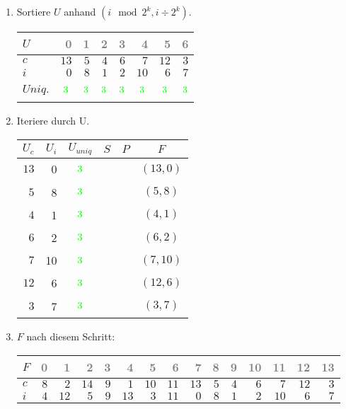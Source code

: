 \begin{enumerate}
\item 
Sortiere $U$ anhand $(i \mod 2^k, i \div 2^k)$.
\begin{center}
\small\begin{tabular}{lrrrrrrr}
    \toprule 
    $U$ & \textcolor{gray}{0} & \textcolor{gray}{1} & \textcolor{gray}{2} & \textcolor{gray}{3} & \textcolor{gray}{4} & \textcolor{gray}{5} & \textcolor{gray}{6}\\
    \midrule 
    $c$ & $13$ & $5$ & $4$ & $6$ & $7$ & $12$ & $3$ \\
    $i$ & $0$ & $8$ & $1$ & $2$ & $10$ & $6$ & $7$ \\
    $Uniq.$ & $$\cmarkc$$ & $$\cmarkc$$ & $$\cmarkc$$ & $$\cmarkc$$ & $$\cmarkc$$ & $$\cmarkc$$ & $$\cmarkc$$ \\
    \bottomrule 
\end{tabular}
\end{center}

\item 
Iteriere durch U.

\begin{center}
\small\begin{tabular}{rrcccc}
\toprule 
 $U_c$ & $U_i$ & $U_{uniq}$ &     $S$      &   $P$   &   $F$   \\
\midrule 
$13$ & 0 & $$\cmarkc$$  &            &       & $(13, 0)$\\
$ 5$ & 8 & $$\cmarkc$$  &            &       & $( 5, 8)$\\
$ 4$ & 1 & $$\cmarkc$$  &            &       & $( 4, 1)$\\
$ 6$ & 2 & $$\cmarkc$$  &            &       & $( 6, 2)$\\
$ 7$ & 10 & $$\cmarkc$$  &            &       & $( 7,10)$\\
$12$ & 6 & $$\cmarkc$$  &            &       & $(12, 6)$\\
$ 3$ & 7 & $$\cmarkc$$  &            &       & $( 3, 7)$\\
\bottomrule 
\end{tabular}
\end{center}
\item 
$F$ nach diesem Schritt:
\begin{center}
\small\begin{tabular}{lrrrrrrrrrrrrrr}
    \toprule 
    $F$ & \textcolor{gray}{0} & \textcolor{gray}{1} & \textcolor{gray}{2} & \textcolor{gray}{3} & \textcolor{gray}{4} & \textcolor{gray}{5} & \textcolor{gray}{6} & \textcolor{gray}{7} & \textcolor{gray}{8} & \textcolor{gray}{9} & \textcolor{gray}{10} & \textcolor{gray}{11} & \textcolor{gray}{12} & \textcolor{gray}{13}\\
    \midrule 
    $c$ & $8$ & $2$ & $14$ & $9$ & $1$ & $10$ & $11$ & $13$ & $5$ & $4$ & $6$ & $7$ & $12$ & $3$ \\
    $i$ & $4$ & $12$ & $5$ & $9$ & $13$ & $3$ & $11$ & $0$ & $8$ & $1$ & $2$ & $10$ & $6$ & $7$ \\
    \bottomrule 
\end{tabular}
\end{center}


\end{enumerate}
